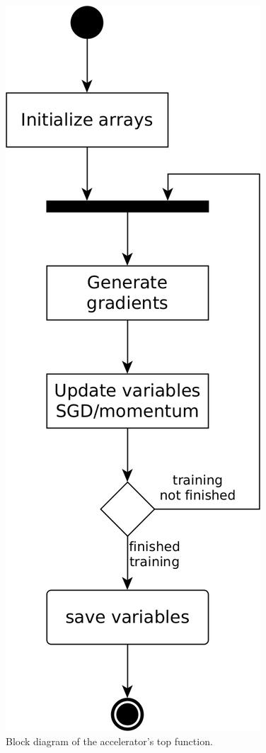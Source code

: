 \begin{figure}[H] %
    \centering
        \includegraphics[height=0.45\textheight]{Images/block_diagrams/accel_top.png}
        \decoRule
        \caption[Top function]{Block diagram of the accelerator's top function.}
        \label{fig: top function}
\end{figure}

